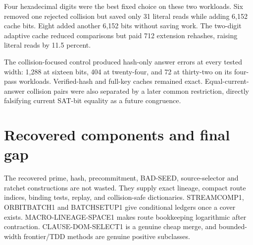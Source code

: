 \documentclass[11pt]{article}
\begin{document}
\begin{center}
\end{center}
Four hexadecimal digits were the best fixed choice on these two workloads.
Six removed one rejected collision but saved only 31 literal reads while
adding 6,152 cache bits.  Eight added another 6,152 bits without saving work.
The two-digit adaptive cache reduced comparisons but paid 712 extension
rehashes, raising literal reads by 11.5 percent.

The collision-focused control produced hash-only answer errors at every
tested width: 1,288 at sixteen bits, 404 at twenty-four, and 72 at thirty-two
on its four-pass workloads.  Verified-hash and full-key caches remained
exact.  Equal-current-answer collision pairs were also separated by a later
common restriction, directly falsifying current SAT-bit equality as a future
congruence.

\section{Recovered components and final gap}
The recovered prime, hash, precommitment, BAD-SEED, source-selector and ratchet
constructions are not wasted.  They supply exact lineage, compact route
indices, binding tests, replay, and collision-safe dictionaries.  STREAMCOMP1,
ORBITBATCH1 and BATCHSETUP1 give conditional ledgers once a cover exists.
MACRO-LINEAGE-SPACE1 makes route bookkeeping logarithmic after contraction.
CLAUSE-DOM-SELECT1 is a genuine cheap merge, and bounded-width frontier/TDD
methods are genuine positive subclasses.
\end{document}
